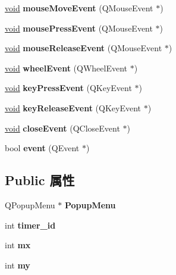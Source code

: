 \begin{DoxyCompactItemize}
\hyperlink{interfacevoid}{void} {\bfseries mouse\+Move\+Event} (Q\+Mouse\+Event $\ast$)
\item 
\mbox{\label{class_q_my_main_window_a634ba36645f585398c39d87792afe2ab}} 
\hyperlink{interfacevoid}{void} {\bfseries mouse\+Press\+Event} (Q\+Mouse\+Event $\ast$)
\item 
\mbox{\label{class_q_my_main_window_a24507715749ec412b26f942961e444fa}} 
\hyperlink{interfacevoid}{void} {\bfseries mouse\+Release\+Event} (Q\+Mouse\+Event $\ast$)
\item 
\mbox{\label{class_q_my_main_window_a3a094e468fc30b5ed800039ad5da716d}} 
\hyperlink{interfacevoid}{void} {\bfseries wheel\+Event} (Q\+Wheel\+Event $\ast$)
\item 
\mbox{\label{class_q_my_main_window_aa63727e1ead27e1157dac0397ff1aa3d}} 
\hyperlink{interfacevoid}{void} {\bfseries key\+Press\+Event} (Q\+Key\+Event $\ast$)
\item 
\mbox{\label{class_q_my_main_window_ab27b60cb8bb72dbd219365262ee18f53}} 
\hyperlink{interfacevoid}{void} {\bfseries key\+Release\+Event} (Q\+Key\+Event $\ast$)
\item 
\mbox{\label{class_q_my_main_window_a4732275c4cf6665dafe2de6fc6aaf4d3}} 
\hyperlink{interfacevoid}{void} {\bfseries close\+Event} (Q\+Close\+Event $\ast$)
\item 
\mbox{\label{class_q_my_main_window_a19f7f5d5021d5ad9ca49ba125bb8bfa7}} 
bool {\bfseries event} (Q\+Event $\ast$)
\end{DoxyCompactItemize}
\subsection*{Public 属性}
\begin{DoxyCompactItemize}
\item 
\mbox{\label{class_q_my_main_window_a29c20fdadb0820b302f34683348e7084}} 
Q\+Popup\+Menu $\ast$ {\bfseries Popup\+Menu}
\item 
\mbox{\label{class_q_my_main_window_a7cdea45ba1f4461c765d9e9b78379ba3}} 
int {\bfseries timer\+\_\+id}
\item 
\mbox{\label{class_q_my_main_window_adca9b8193a7d2f26a734f472a2173722}} 
int {\bfseries mx}
\item 
\mbox{\label{class_q_my_main_window_aef75c9ab1218b710aec40315caaecb3f}} 
int {\bfseries my}
\end{DoxyCompactItemize}


